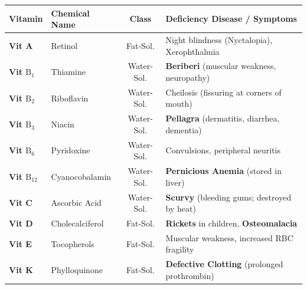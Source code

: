 \documentclass[10pt,twoside,openright]{book}
\begin{document}
\begin{formulabox}
{\fontsize{7.5pt}{9.0pt}\selectfont\setlength{\tabcolsep}{1.5pt}
\begin{tabularx}{\linewidth}{l l c >{\RaggedRight}X}
\toprule
\textbf{Vitamin} & \textbf{Chemical Name} & \textbf{Class} & \textbf{Deficiency Disease / Symptoms} \\
\midrule
\textbf{Vit A} & Retinol & Fat-Sol. & Night blindness (Nyctalopia), Xerophthalmia \\
\textbf{Vit $\mathrm{B_1}$} & Thiamine & Water-Sol. & \textbf{Beriberi} (muscular weakness, neuropathy) \\
\textbf{Vit $\mathrm{B_2}$} & Riboflavin & Water-Sol. & Cheilosis (fissuring at corners of mouth) \\
\textbf{Vit $\mathrm{B_3}$} & Niacin & Water-Sol. & \textbf{Pellagra} (dermatitis, diarrhea, dementia) \\
\textbf{Vit $\mathrm{B_6}$} & Pyridoxine & Water-Sol. & Convulsions, peripheral neuritis \\
\textbf{Vit $\mathrm{B_{12}}$} & Cyanocobalamin & Water-Sol. & \textbf{Pernicious Anemia} (stored in liver) \\
\textbf{Vit C} & Ascorbic Acid & Water-Sol. & \textbf{Scurvy} (bleeding gums; destroyed by heat) \\
\textbf{Vit D} & Cholecalciferol & Fat-Sol. & \textbf{Rickets} in children, \textbf{Osteomalacia} \\
\textbf{Vit E} & Tocopherols & Fat-Sol. & Muscular weakness, increased RBC fragility \\
\textbf{Vit K} & Phylloquinone & Fat-Sol. & \textbf{Defective Clotting} (prolonged prothrombin) \\
\bottomrule
\end{tabularx}}
\end{formulabox}
\end{document}
